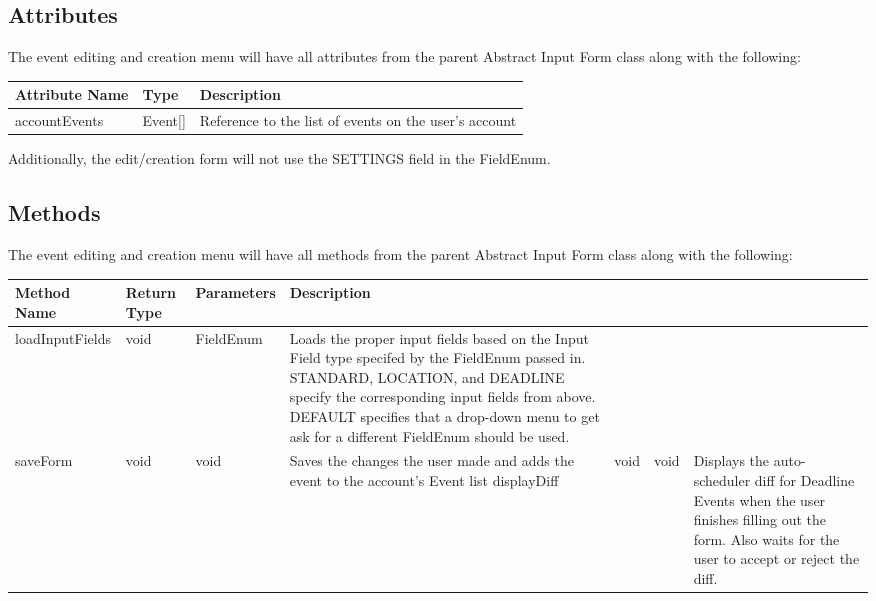 \documentclass{scrreprt}
\begin{document}
\subsection{Attributes}

The event editing and creation menu will have all attributes from the parent Abstract Input Form class along with the following:

\begin{center}
\begin{longtable}{ | p{3cm} | p{3cm} | p{9cm} | }
\hline
\textbf{Attribute Name} & \textbf{Type} & \textbf{Description} \\
\hline
accountEvents & Event[] & Reference to the list of events on the user's account \\
\hline
\end{longtable}
\end{center}

Additionally, the edit/creation form will not use the SETTINGS field in the FieldEnum.

\subsection{Methods}

The event editing and creation menu will have all methods from the parent Abstract Input Form class along with the following:

\begin{center}
\begin{longtable}{ | p{3cm} | p{1cm} | p{2cm} | p{9cm} | }
\hline
\textbf{Method Name} & \textbf{Return Type} & \textbf{Parameters} & \textbf{Description} \\
\hline
loadInputFields & void & FieldEnum & Loads the proper input fields based on the Input Field type specifed by the FieldEnum passed in. STANDARD, LOCATION, and DEADLINE specify the corresponding input fields from above.  DEFAULT specifies that a drop-down menu to get ask for a different FieldEnum should be used. \\
\hline
saveForm & void & void & Saves the changes the user made and adds the event to the account's Event list
\hline
displayDiff & void & void & Displays the auto-scheduler diff for Deadline Events when the user finishes filling out the form. Also waits for the user to accept or reject the diff. \\
\hline
\end{longtable}
\end{center}
\end{document}

